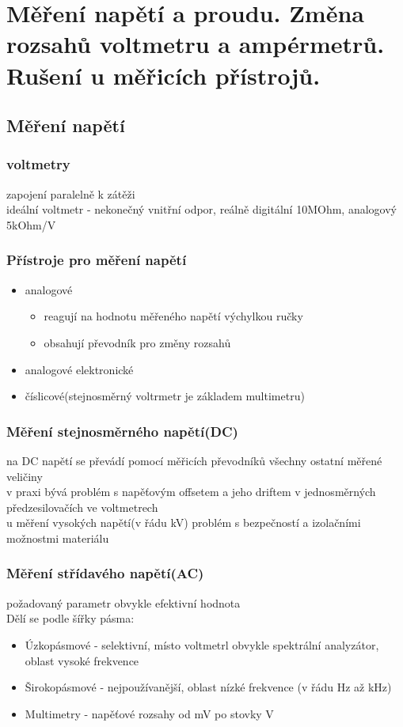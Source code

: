 \section{Měření napětí a proudu. Změna rozsahů voltmetru a ampérmetrů. Rušení u měřicích přístrojů.}

\subsection*{Měření napětí}
\subsubsection*{voltmetry}
zapojení paralelně k zátěži\\
ideální voltmetr - nekonečný vnitřní odpor, reálně digitální 10MOhm, analogový 5kOhm/V \\
\subsubsection*{Přístroje pro měření napětí}
\begin{itemize}
    \item analogové
    \begin{itemize}
        \item reagují na hodnotu měřeného napětí výchylkou ručky
        \item obsahují převodník pro změny rozsahů
    \end{itemize}
    \item analogové elektronické 
    \item číslicové(stejnosměrný voltrmetr je základem multimetru)
\end{itemize}
\subsubsection*{Měření stejnosměrného napětí(DC)}
na DC napětí se převádí pomocí měřicích převodníků všechny ostatní měřené veličiny\\
v praxi bývá problém s napěťovým offsetem a jeho driftem v jednosměrných předzesilovačích ve voltmetrech\\
u měření vysokých napětí(v řádu kV) problém s bezpečností a izolačními možnostmi materiálu\\
\subsubsection*{Měření střídavého napětí(AC)}
požadovaný parametr obvykle efektivní hodnota\\
Dělí se podle šířky pásma:
\begin{itemize}
    \item Úzkopásmové - selektivní, místo voltmetrl obvykle spektrální analyzátor, oblast vysoké frekvence
    \item Širokopásmové - nejpoužívanější, oblast nízké frekvence (v řádu Hz až kHz)
    \item Multimetry - napěťové rozsahy od mV po stovky V
\end{itemize}
\newpage


